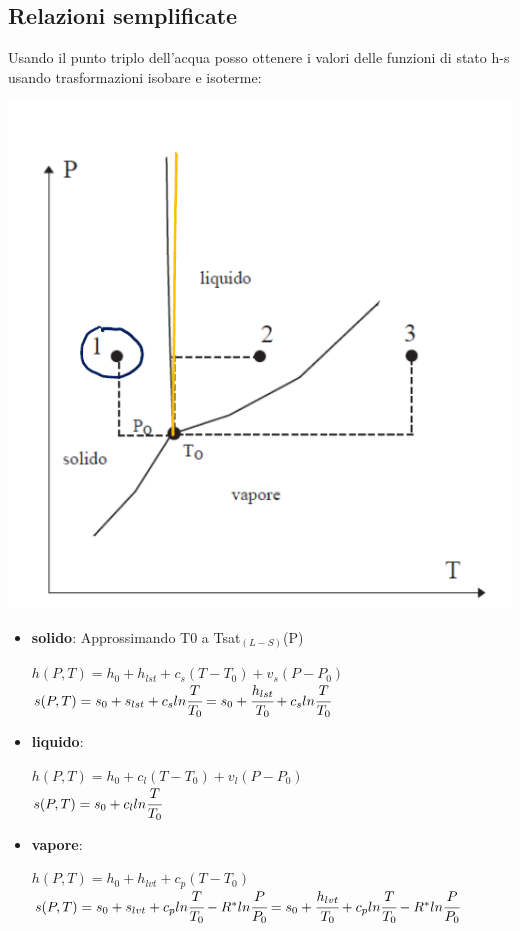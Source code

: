 \documentclass[a4paper,12pt,titlepage]{article}
\begin{document}
\subsection{Relazioni semplificate}
Usando il punto triplo dell'acqua posso ottenere i valori delle funzioni di stato h-s usando trasformazioni isobare e isoterme:
\begin{center}
\includegraphics[scale=0.45]{p_t}
\end{center}
\begin{itemize}
\item \textbf{solido}:
Approssimando T0 a Tsat$_(L-S)$(P)
\begin{center}
$h(P,T) = h_{0} + h_{lst} +c_{s}(T-T_{0}) + v_{s}(P-P_{0}) $\\
$s(P,T) = s_{0}+s_{lst}+c_{s}ln\cfrac{T}{T_{0}} =  s_{0}+\cfrac{h_{lst}}{T_{0}}+c_{s}ln\cfrac{T}{T_{0}} $
\end{center}
\item \textbf{liquido}:
\begin{center}
$h(P,T)=h_{0}+c_{l}(T-T_{0}) +v_{l}(P-P_{0}) $\\
$ s(P,T) = s_{0}+c_{l}ln\cfrac{T}{T_{0}}$ 
\end{center}
\item \textbf{vapore}:
\begin{center}
$h(P,T)=h_{0}+h_{lvt} +c_{p}(T-T_{0}) $\\
$s(P,T) = s_{0}+s_{lvt}+c_{p}ln\cfrac{T}{T_{0}} - R^{*}ln\cfrac{P}{P_{0}} =  s_{0}+\cfrac{h_{lvt}}{T_{0}}+c_{p}ln\cfrac{T}{T_{0}}  - R^{*}ln\cfrac{P}{P_{0}} $
\end{center}
\end{itemize}
\end{document}
